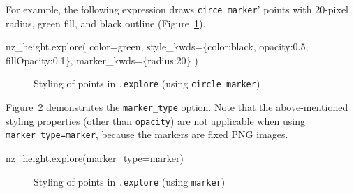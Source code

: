 \documentclass[
  letterpaper,
]{krantz}
\newenvironment{Shaded}{\begin{snugshade}}{\end{snugshade}}
\newcommand{\DecValTok}[1]{\textcolor[rgb]{0.68,0.00,0.00}{#1}}
\newcommand{\FloatTok}[1]{\textcolor[rgb]{0.68,0.00,0.00}{#1}}
\newcommand{\NormalTok}[1]{\textcolor[rgb]{0.00,0.23,0.31}{#1}}
\newcommand{\OperatorTok}[1]{\textcolor[rgb]{0.37,0.37,0.37}{#1}}
\newcommand{\StringTok}[1]{\textcolor[rgb]{0.13,0.47,0.30}{#1}}
\begin{document}
For example, the following expression draws
\texttt{\textquotesingle{}circe\_marker}' points with 20-pixel radius,
green fill, and black outline (Figure~\ref{fig-explore-styling-points}).

\begin{Shaded}
\begin{Highlighting}[]
\NormalTok{nz\_height.explore(}
\NormalTok{    color}\OperatorTok{=}\StringTok{\textquotesingle{}green\textquotesingle{}}\NormalTok{, }
\NormalTok{    style\_kwds}\OperatorTok{=}\NormalTok{\{}\StringTok{\textquotesingle{}color\textquotesingle{}}\NormalTok{:}\StringTok{\textquotesingle{}black\textquotesingle{}}\NormalTok{, }\StringTok{\textquotesingle{}opacity\textquotesingle{}}\NormalTok{:}\FloatTok{0.5}\NormalTok{, }\StringTok{\textquotesingle{}fillOpacity\textquotesingle{}}\NormalTok{:}\FloatTok{0.1}\NormalTok{\}, }
\NormalTok{    marker\_kwds}\OperatorTok{=}\NormalTok{\{}\StringTok{\textquotesingle{}radius\textquotesingle{}}\NormalTok{:}\DecValTok{20}\NormalTok{\}}
\NormalTok{)}
\end{Highlighting}
\end{Shaded}

\begin{figure}


\caption{\label{fig-explore-styling-points}Styling of points in
\texttt{.explore} (using \texttt{circle\_marker})}

\end{figure}%

Figure~\ref{fig-explore-styling-points2} demonstrates the
\texttt{\textquotesingle{}marker\_type\textquotesingle{}} option. Note
that the above-mentioned styling properties (other than
\texttt{opacity}) are not applicable when using
\texttt{marker\_type=\textquotesingle{}marker\textquotesingle{}},
because the markers are fixed PNG images.

\begin{Shaded}
\begin{Highlighting}[]
\NormalTok{nz\_height.explore(marker\_type}\OperatorTok{=}\StringTok{\textquotesingle{}marker\textquotesingle{}}\NormalTok{)}
\end{Highlighting}
\end{Shaded}

\begin{figure}


\caption{\label{fig-explore-styling-points2}Styling of points in
\texttt{.explore} (using \texttt{marker})}

\end{figure}%
\end{document}
